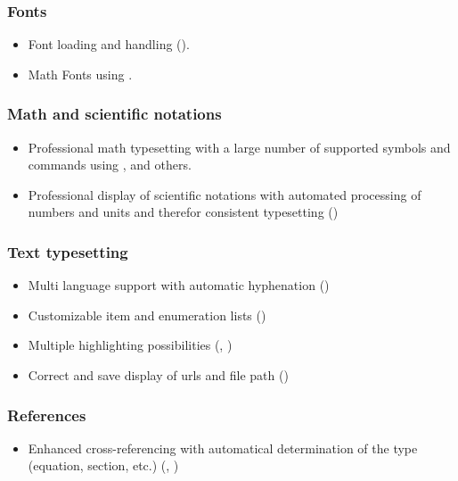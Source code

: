 \subsubsection*{Fonts}
\begin{itemize}
\item Font loading and handling ().
\item Math Fonts using .
\end{itemize}

\subsubsection*{Math and scientific notations}
\begin{itemize}
\item Professional math typesetting with a large number of supported symbols and commands using ,  and others.
%
\item Professional display of scientific notations with automated processing of numbers and units and therefor consistent typesetting ()
%
\end{itemize}

\subsubsection*{Text typesetting}
\begin{itemize}
\item Multi language support with automatic hyphenation ()
%
\item Customizable item and enumeration lists ()
%
\item Multiple highlighting possibilities (, )
%
\item Correct and save display of urls and file path ()
\end{itemize}


\subsubsection*{References}
\begin{itemize}
\item Enhanced cross-referencing with automatical determination of the type (equation, section, etc.) (, )
\end{itemize}


